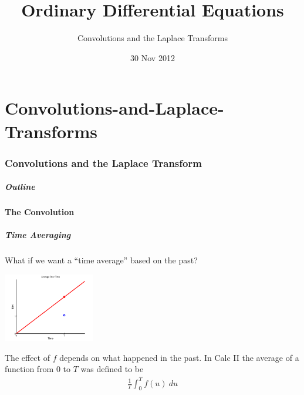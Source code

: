 \part{Convolutions-and-Laplace-Transforms}
\section{Convolutions and the Laplace Transform}

\title{Ordinary Differential Equations}
\subtitle{Convolutions and the Laplace Transforms}
\date{30 Nov 2012}

\begin{frame}
  \titlepage
\end{frame}

\begin{frame}
  \frametitle{Outline}
\end{frame}


\subsection{The Convolution}


\begin{frame}
  \frametitle{Time Averaging}

  What if we want a ``time average'' based on the past? 

  \centerline{\includegraphics[width=4cm]{img/linearAverage}}

  {%

    The effect of $f$ depends on what happened in the past. 
    In Calc II the average of a function from $0$ to $T$ was defined to be 
    \begin{eqnarray*}
      \frac{1}{T} \int^T_0 f(u) ~ du
    \end{eqnarray*}

  }


\end{frame}

